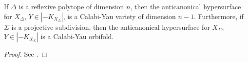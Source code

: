\documentclass[../main.tex]{subfiles}
\begin{document}
\begin{proposition} 
    If $\Delta$ is a reflexive polytope of dimension $n$, then the anticanonical hypersurface for $X_{\Delta}$, $\bar Y \in |-K_{X_\Delta}|$, is a Calabi-Yau variety of dimension $n-1$. Furthermore, if $\Sigma$ is a projective subdivision, then the anticanonical hypersurface for $X_{\Sigma}$, $ Y \in |-K_{X_\Sigma}|$ is a Calabi-Yau orbifold.
\end{proposition}
\begin{proof} See \cite[Prop. 4.1.3]{CK99}.
\end{proof}
\end{document}
